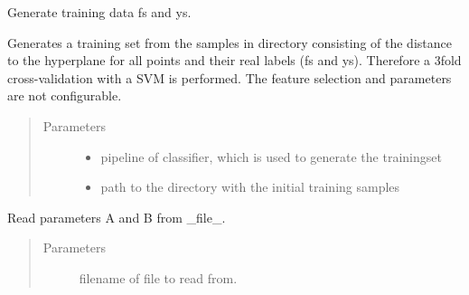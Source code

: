 \documentclass[letterpaper,10pt,english]{sphinxmanual}
\begin{document}
\begin{fulllineitems}
\begin{fulllineitems}
\label{\detokenize{api:probability.Probability.generate_trainingset}}
Generate training data fs and ys.

Generates a training set from the samples in directory
consisting of the distance to the hyperplane for all points
and their real labels (fs and ys). Therefore a 3fold
cross-validation with a SVM is performed. The feature
selection and parameters are not configurable.
\begin{quote}\begin{description}
\item[{Parameters}] \leavevmode\begin{itemize}
\item {} 
 \textendash{} pipeline of classifier, which is used to generate
the trainingset

\item {} 
 \textendash{} path to the directory with the initial training samples

\end{itemize}

\end{description}\end{quote}

\end{fulllineitems}


\begin{fulllineitems}
\label{\detokenize{api:probability.Probability.read_from_file}}
Read parameters A and B from \_file\_.
\begin{quote}\begin{description}
\item[{Parameters}] \leavevmode
{} \textendash{} filename of file to read from.

\end{description}\end{quote}

\end{fulllineitems}



\end{fulllineitems}
\end{document}
